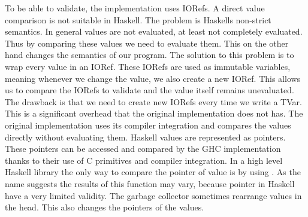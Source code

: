 To be able to validate, the implementation uses IORefs. A direct value comparison is not suitable in Haskell.
The problem is Haskells non-strict semantics. In general values are not evaluated, at least not completely evaluated. 
Thus by comparing these values we need to evaluate them. This on the other hand changes the semantics of our program.
The solution to this problem is to wrap every value in an IORef. These IORefs are used as immutable variables, meaning
whenever we change the value, we also create a new IORef. This allows us to compare the IORefs to validate and the 
value itself remains unevaluated. The drawback is that we need to create new IORefs every time we write a TVar. 
This is a significant overhead that the original implementation does not has. The original implementation uses its 
compiler integration and compares the values directly without evaluating them. Haskell values are represented as 
pointers. These pointers can be accessed and compared by the GHC implementation thanks to their use of C primitives 
and compiler integration. In a high level Haskell library the only way to compare the pointer of value is by using
. As the name suggests the results of this function may vary, because pointer in Haskell
have a very limited validity. The garbage collector sometimes rearrange values in the head. This also changes the 
pointers of the values. 

